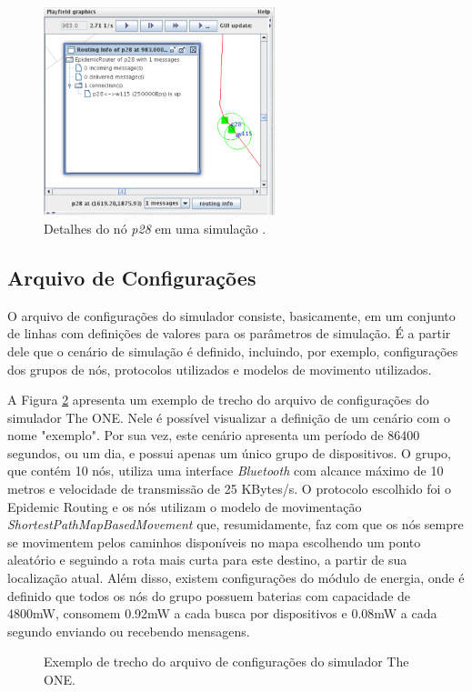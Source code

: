 \begin{figure}[htp!]
    \centering
    \includegraphics[width=0.6\textwidth]{figuras/cap_3/secao_1/node_theONE.PNG}
    \caption{Detalhes do nó \emph{p28} em uma simulação \cite{keranen2009one}.}
    \label{node_theONE}
\end{figure}

\newpage
\subsection{Arquivo de Configurações}
\label{subsec:arquivo_configuracao}
O arquivo de configurações do simulador consiste, basicamente, em um conjunto de linhas com definições de valores para os parâmetros de simulação. É a partir dele que o cenário de simulação é definido, incluindo, por exemplo, configurações dos grupos de nós, protocolos utilizados e modelos de movimento utilizados.

A Figura \ref{exemplo_config} apresenta um exemplo de trecho do arquivo de configurações do simulador The ONE. Nele é possível visualizar a definição de um cenário com o nome "exemplo". Por sua vez, este cenário apresenta um período de 86400 segundos, ou um dia, e possui apenas um único grupo de dispositivos. O grupo, que contém 10 nós,  utiliza uma interface \emph{Bluetooth} com alcance máximo de 10 metros e velocidade de transmissão de 25 KBytes/s. O protocolo escolhido foi o Epidemic Routing e os nós utilizam o modelo de movimentação \emph{ShortestPathMapBasedMovement} que, resumidamente, faz com que os nós sempre se movimentem pelos caminhos disponíveis no mapa escolhendo um ponto aleatório e seguindo a rota mais curta para este destino, a partir de sua localização atual. Além disso, existem configurações do módulo de energia, onde é definido que todos os nós do grupo possuem baterias com capacidade de 4800mW, consomem 0.92mW a cada busca por dispositivos e 0.08mW a cada segundo enviando ou recebendo mensagens.

\begin{figure}[htp!]
\centering

\caption{Exemplo de trecho do arquivo de configurações do simulador The ONE.}
\label{exemplo_config}
\end{figure}